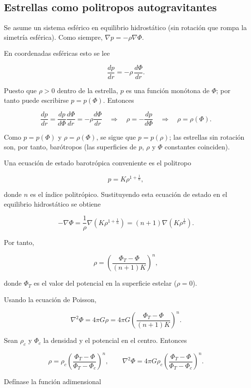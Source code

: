 \figuraTemperaturaSolar

\subsection{Estrellas como politropos autogravitantes}

Se asume un sistema esférico en equilibrio hidrostático (sin rotación que rompa la simetría esférica). Como siempre, $\nabla p = -\rho\nabla\Phi$.

En coordenadas esféricas esto se lee

$$ \frac{dp}{dr} = -\rho\,\frac{d\Phi}{dr}. $$

Puesto que $\rho > 0$ dentro de la estrella, $p$ es una función monótona de $\Phi$; por tanto puede escribirse $p = p(\Phi)$. Entonces

$$ \frac{dp}{dr} = \frac{dp}{d\Phi}\frac{d\Phi}{dr} = -\rho\frac{d\Phi}{dr} \quad\Rightarrow\quad \rho = -\frac{dp}{d\Phi} \quad\Rightarrow\quad \rho = \rho(\Phi). $$

Como $p = p(\Phi)$ y $\rho = \rho(\Phi)$, se sigue que $p = p(\rho)$; las estrellas sin rotación son, por tanto, barótropos (las superficies de $p$, $\rho$ y $\Phi$ constantes coinciden).

Una ecuación de estado barotrópica conveniente es el politropo

$$ p = K\rho^{1 + \frac{1}{n}}, $$

donde $n$ es el índice politrópico. Sustituyendo esta ecuación de estado en el equilibrio hidrostático se obtiene

$$ -\nabla\Phi = \frac{1}{\rho}\nabla\left(K\rho^{1+\frac{1}{n}}\right) = (n+1)\nabla\left(K\rho^{\frac{1}{n}}\right). $$

Por tanto,

$$ \rho = \left(\frac{\Phi_T - \Phi}{(n+1)K}\right)^n, $$

donde $\Phi_T$ es el valor del potencial en la superficie estelar ($\rho = 0$).

Usando la ecuación de Poisson,

$$ \nabla^2\Phi = 4\pi G\rho = 4\pi G\left(\frac{\Phi_T - \Phi}{(n+1)K}\right)^n. $$

Sean $\rho_c$ y $\Phi_c$ la densidad y el potencial en el centro. Entonces

$$ \rho = \rho_c\left(\frac{\Phi_T - \Phi}{\Phi_T - \Phi_c}\right)^n, \qquad \nabla^2\Phi = 4\pi G\rho_c\left(\frac{\Phi_T - \Phi}{\Phi_T - \Phi_c}\right)^n. $$

Defínase la función adimensional

